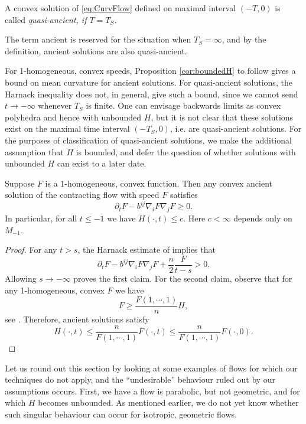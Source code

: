 \documentclass{amsart}
\begin{document}
\begin{definition}
A convex solution of \eqref{eq:CurvFlow} defined on maximal interval $(-T,0)$ is called \it{quasi-ancient}, if $T=T_S$.
\end{definition}

The term ancient is reserved for the situation when \(T_S=\infty\), and by the definition, ancient solutions are also quasi-ancient.

For 1-homogeneous, convex speeds, Proposition \ref{cor:boundedH} to follow gives a bound on mean curvature for ancient solutions. For quasi-ancient solutions, the Harnack inequality does not, in general, give such a bound, since we cannot send \(t \to -\infty\) whenever \(T_S\) is finite. One can envisage backwards limits as convex polyhedra and hence with unbounded \(H\), but it is not clear that these solutions exist on the maximal time interval \((-T_S, 0)\), i.e. are quasi-ancient solutions. For the purposes of classification of quasi-ancient solutions, we make the additional assumption that \(H\) is bounded, and defer the question of whether solutions with unbounded \(H\) can exist to a later date.

\begin{proposition}
\label{cor:boundedH}

Suppose $F$ is a \(1\)-homogeneous, convex function. Then any convex ancient solution of the contracting flow with speed $F$ satisfies
\[\partial_t F-b^{ij}\nabla_i F \nabla_j F \geq 0.\]
In particular, for all $t\le -1$ we have
$H(\cdot,t)\leq c.$
Here $c<\infty$ depends only on $M_{-1}.$
\end{proposition}

\begin{proof}
For any $t>s$, the  Harnack estimate of \cite[Theorem 1]{bryan2015harnack} implies that
$$\partial_t F-b^{ij}\nabla_i F\nabla_j F+\frac{n}{2}\frac{F}{t-s}>0.$$
Allowing $s\to-\infty$ proves the first claim. For the second claim, observe that for any 1-homogeneous, convex $F$ we have \[F\ge \frac{F(1,\cdots,1)}{n}H,\]
see \cite[Chapter 2]{Gerhardt:/2006}. Therefore, ancient solutions satisfy
\[H(\cdot,t)\leq \frac{n}{F(1,\cdots,1)}F(\cdot,t)\leq \frac{n}{F(1,\cdots,1)}F(\cdot,0). \]
\end{proof}

Let us round out this section by looking at some examples of flows for which our techniques do not apply, and the ``undesirable'' behaviour ruled out by our assumptions occurs. First, we have a flow is parabolic, but not geometric, and for which \(H\) becomes unbounded. As mentioned earlier, we do not yet know whether such singular behaviour can occur for isotropic, geometric flows.
\end{document}
